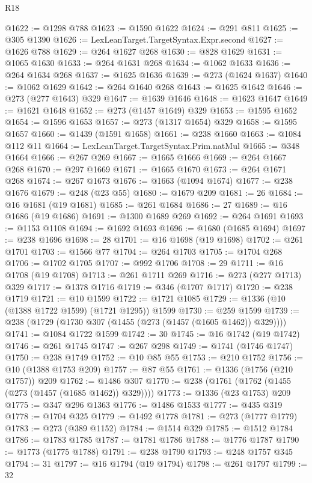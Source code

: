 \begin{lexlean}{R18}
\begin{coremodule}
{{{{{{{{{{{{{{{{{{{@1622 := @1298 @788
@1623 := @1590 @1622
@1624 := @291 @811
@1625 := @305 @1390
@1626 := LexLeanTarget.TargetSyntax.Expr.second
@1627 := @1626 @788
@1629 := @264 @1627 @268
@1630 := @828 @1629
@1631 := @1065 @1630
@1633 := @264 @1631 @268
@1634 := @1062 @1633
@1636 := @264 @1634 @268
@1637 := @1625 @1636
@1639 := @273 (@1624 @1637)
@1640 := @1062 @1629
@1642 := @264 @1640 @268
@1643 := @1625 @1642
@1646 := @273 (@277 @1643) @329
@1647 := @1639 @1646
@1648 := @1623 @1647
@1649 := @1621 @1648
@1652 := @273 (@1457 @1649) @329
@1653 := @1595 @1652
@1654 := @1596 @1653
@1657 := @273 (@1317 @1654) @329
@1658 := @1595 @1657
@1660 := @1439 (@1591 @1658)
@1661 := @238 @1660
@1663 := @1084 @112 @11
@1664 := LexLeanTarget.TargetSyntax.Prim.natMul
@1665 := @348 @1664
@1666 := @267 @269
@1667 := @1665 @1666
@1669 := @264 @1667 @268
@1670 := @297 @1669
@1671 := @1665 @1670
@1673 := @264 @1671 @268
@1674 := @267 @1673
@1676 := @1663 (@1094 @1674)
@1677 := @238 @1676
@1679 := @248 (@23 @55)
@1680 := @1679 @209
@1681 := 26
@1684 := @16 @1681 (@19 @1681)
@1685 := @261 @1684
@1686 := 27
@1689 := @16 @1686 (@19 @1686)
@1691 := @1300 @1689 @269
@1692 := @264 @1691
@1693 := @1153 @1108
@1694 := @1692 @1693
@1696 := @1680 (@1685 @1694)
@1697 := @238 @1696
@1698 := 28
@1701 := @16 @1698 (@19 @1698)
@1702 := @261 @1701
@1703 := @1566 @77
@1704 := @264 @1703
@1705 := @1704 @268
@1706 := @1702 @1705
@1707 := @992 @1706
@1708 := 29
@1711 := @16 @1708 (@19 @1708)
@1713 := @261 @1711 @269
@1716 := @273 (@277 @1713) @329
@1717 := @1378 @1716
@1719 := @346 (@1707 @1717)
@1720 := @238 @1719
@1721 := @10 @1599
@1722 := @1721 @1085
@1729 := @1336 (@10 (@1388 @1722 @1599) (@1721 @1295)) @1599
@1730 := @259 @1599
@1739 := @238 (@1729 (@1730 @307 (@1455 (@273 (@1457 (@1605 @1462)) @329))))
@1741 := @1084 @1722 @1599
@1742 := 30
@1745 := @16 @1742 (@19 @1742)
@1746 := @261 @1745
@1747 := @267 @298
@1749 := @1741 (@1746 @1747)
@1750 := @238 @1749
@1752 := @10 @85 @55
@1753 := @210 @1752
@1756 := @10 (@1388 @1753 @209)
@1757 := @87 @55
@1761 := @1336 (@1756 (@210 @1757)) @209
@1762 := @1486 @307
@1770 := @238 (@1761 (@1762 (@1455 (@273 (@1457 (@1685 @1462)) @329))))
@1773 := @1336 (@23 @1753) @209
@1775 := @347 @296 @1363
@1776 := @1486 @1533
@1777 := @435 @319
@1778 := @1704 @325
@1779 := @1492 @1778
@1781 := @273 (@1777 @1779)
@1783 := @273 (@389 @1152)
@1784 := @1514 @329
@1785 := @1512 @1784
@1786 := @1783 @1785
@1787 := @1781 @1786
@1788 := @1776 @1787
@1790 := @1773 (@1775 @1788)
@1791 := @238 @1790
@1793 := @248 @1757 @345
@1794 := 31
@1797 := @16 @1794 (@19 @1794)
@1798 := @261 @1797
@1799 := 32
}}}}}}}}}}}}}}}}}}}
\end{coremodule}
\end{lexlean}
